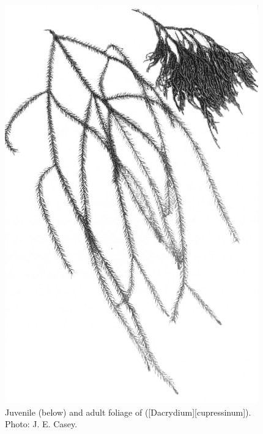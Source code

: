 \begin{figure}[t]
	\begin{minipage}[t]{\textwidth}
		\begin{minipage}[t]{(\textwidth-\fgap) * \real{0.501}}
			\centering
			\includegraphics[width=\textwidth]{graphics/fig_021}
			\caption[Rimu foliage]{Juvenile (below) and adult foliage of  ([Dacrydium][cupressinum]).
			Photo: J. E. Casey.}%
			\label{fig:21rimu}
		\end{minipage}\hspace{\fgap}%
		\begin{minipage}[t]{(\textwidth-\fgap) * \real{0.499}}

\end{minipage}
\end{minipage}
\end{figure}
